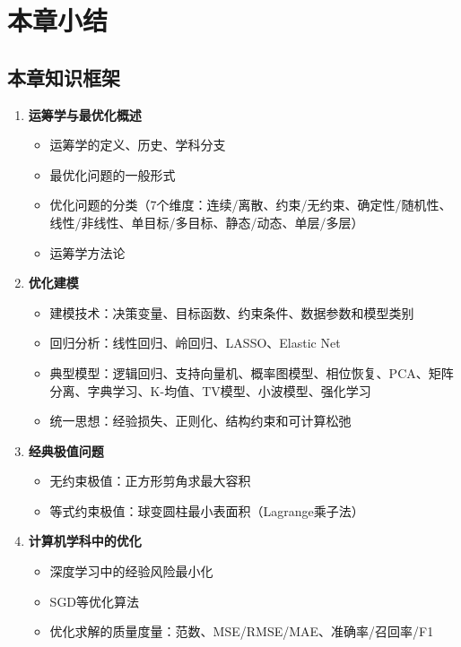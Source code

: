 \section{本章小结}\label{sec:ch1-summary}

\subsection{本章知识框架}

\begin{conceptbox}[第一章核心内容]
\begin{enumerate}[label=\arabic*., leftmargin=2em]
    \item \textbf{运筹学与最优化概述}
    \begin{itemize}
        \item 运筹学的定义、历史、学科分支
        \item 最优化问题的一般形式
        \item 优化问题的分类（7个维度：连续/离散、约束/无约束、确定性/随机性、线性/非线性、单目标/多目标、静态/动态、单层/多层）
        \item 运筹学方法论
    \end{itemize}
    \item \textbf{优化建模}
    \begin{itemize}
        \item 建模技术：决策变量、目标函数、约束条件、数据参数和模型类别
        \item 回归分析：线性回归、岭回归、LASSO、Elastic Net
        \item 典型模型：逻辑回归、支持向量机、概率图模型、相位恢复、PCA、矩阵分离、字典学习、K-均值、TV模型、小波模型、强化学习
        \item 统一思想：经验损失、正则化、结构约束和可计算松弛
    \end{itemize}
    \item \textbf{经典极值问题}
    \begin{itemize}
        \item 无约束极值：正方形剪角求最大容积
        \item 等式约束极值：球变圆柱最小表面积（Lagrange乘子法）
    \end{itemize}
    \item \textbf{计算机学科中的优化}
    \begin{itemize}
        \item 深度学习中的经验风险最小化
        \item SGD等优化算法
        \item 优化求解的质量度量：范数、MSE/RMSE/MAE、准确率/召回率/F1

\end{itemize}
\end{enumerate}
\end{conceptbox}
